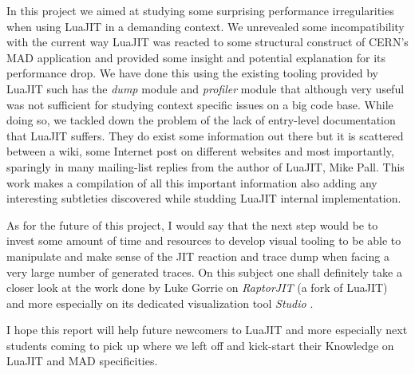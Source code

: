 
In this project we aimed at studying some surprising performance irregularities
when using LuaJIT in a demanding context. We unrevealed some incompatibility
with the current way LuaJIT was reacted to some structural construct of CERN's
MAD application and provided some insight and potential explanation for its
performance drop. We have done this using the existing tooling provided by
LuaJIT such has the \emph{dump} module and \emph{profiler} module that although
very useful was not sufficient for studying context specific issues on a big code
base. While doing so, we tackled down the problem of the lack of entry-level
documentation that LuaJIT suffers. They do exist some information out there but
it is scattered between a wiki, some Internet post on different websites and most
importantly, sparingly in many mailing-list replies from the author of LuaJIT,
Mike Pall. This work makes a compilation of all this important information
also adding any interesting subtleties discovered while studding LuaJIT internal
implementation.

As for the future of this project, I would say that the next step would be to
invest some amount of time and resources to develop visual tooling to be able
to manipulate and make sense of the JIT reaction and trace dump when facing a
very large number of generated traces. On this subject one shall definitely take
a closer look at the work done by Luke Gorrie on \emph{RaptorJIT}
\cite{RaptorJIT} (a fork of LuaJIT) and more especially on its dedicated
visualization tool \emph{Studio} \cite{Studio}.

I hope this report will help future newcomers to LuaJIT and more especially next
students coming to pick up where we left off and kick-start their Knowledge on
LuaJIT and MAD specificities.
